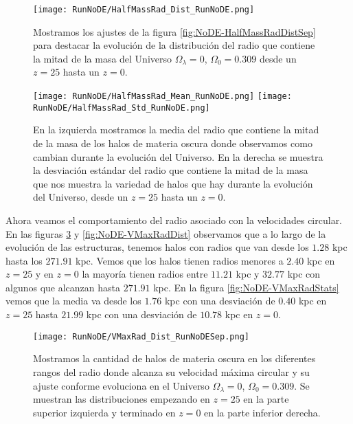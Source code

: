 \begin{figure}[H]
    \centering
    \texttt{[image: RunNoDE/HalfMassRad\_Dist\_RunNoDE.png]}
    \caption[Distribución del radio que contiene la mitad de la masa]{\footnotesize Mostramos los ajustes de la figura \ref{fig:NoDE-HalfMassRadDistSep} para destacar la evolución de la distribución del radio que contiene la mitad de la masa del Universo $\Omega_\lambda = 0$, $\Omega_0 = 0.309$ desde un $z=25$ hasta un $z=0$.}
    \label{fig:NoDE-HalfMassRadDist}
\end{figure}

\begin{figure}[H]
    \centering
    \texttt{[image: RunNoDE/HalfMassRad\_Mean\_RunNoDE.png]}
    \texttt{[image: RunNoDE/HalfMassRad\_Std\_RunNoDE.png]}
    \caption[Media y desviación estándar del radio de la mitad de la masa]{\footnotesize En la izquierda mostramos la media del radio que contiene la mitad de la masa de los halos de materia oscura donde observamos como cambian durante la evolución del Universo. En la derecha se muestra la desviación estándar del radio que contiene la mitad de la masa que nos muestra la variedad de halos que hay durante la evolución del Universo, desde un $z=25$ hasta un $z=0$.}
    \label{fig:NoDE-HalfMassRadStats}
\end{figure}

Ahora veamos el comportamiento del radio asociado con la velocidades circular. En las figuras \ref{fig:NoDE-VMaxRadDistSep} y \ref{fig:NoDE-VMaxRadDist} observamos que a lo largo de la evolución de las estructuras, tenemos halos con radios que van desde los $1.28$ kpc hasta los $271.91$ kpc. Vemos que los halos tienen radios menores a $2.40$ kpc en $z=25$ y en $z=0$ la mayoría tienen radios entre $11.21$ kpc y $32.77$ kpc con algunos que alcanzan hasta $271.91$ kpc. En la figura \ref{fig:NoDE-VMaxRadStats} vemos que la media va desde los $1.76$ kpc con una desviación de $0.40$ kpc en $z=25$ hasta $21.99$ kpc con una desviación de $10.78$ kpc en $z=0$.

\begin{figure}[H]
    \centering
    \texttt{[image: RunNoDE/VMaxRad\_Dist\_RunNoDESep.png]}
    \caption[Radio donde se alcanza la velocidad máxima circular]{\footnotesize Mostramos la cantidad de halos de materia oscura en los diferentes rangos del radio donde alcanza su velocidad máxima circular y su ajuste conforme evoluciona en el Universo $\Omega_\lambda = 0$, $\Omega_0 = 0.309$. Se muestran las distribuciones empezando en $z=25$ en la parte superior izquierda y terminado en $z=0$ en la parte inferior derecha.}
    \label{fig:NoDE-VMaxRadDistSep}
\end{figure}

